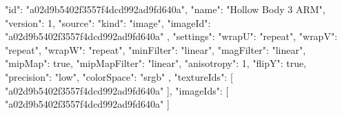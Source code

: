 {
  "id": "a02d9b5402f3557f4dcd992ad9fd640a",
  "name": "Hollow Body 3 ARM",
  "version": 1,
  "source": {
    "kind": "image",
    "imageId": "a02d9b5402f3557f4dcd992ad9fd640a"
  },
  "settings": {
    "wrapU": "repeat",
    "wrapV": "repeat",
    "wrapW": "repeat",
    "minFilter": "linear",
    "magFilter": "linear",
    "mipMap": true,
    "mipMapFilter": "linear",
    "anisotropy": 1,
    "flipY": true,
    "precision": "low",
    "colorSpace": "srgb"
  },
  "textureIds": [
    "a02d9b5402f3557f4dcd992ad9fd640a"
  ],
  "imageIds": [
    "a02d9b5402f3557f4dcd992ad9fd640a"
  ]
}
